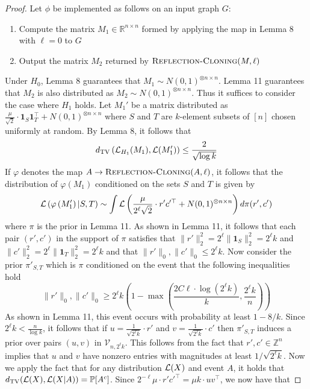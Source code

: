\documentclass[11pt]{article}
\begin{document}
\begin{proof}
Let $\phi$ be implemented as follows on an input graph $G$:
\begin{enumerate}
\item Compute the matrix $M_1 \in \mathbb{R}^{n \times n}$ formed by applying the map in Lemma 8 with $\ell = 0$ to $G$
\item Output the matrix $M_2$ returned by $\textsc{Reflection-Cloning}(M, \ell)$
\end{enumerate}
Under $H_0$, Lemma 8 guarantees that $M_1 \sim N(0, 1)^{\otimes n \times n}$. Lemma 11 guarantees that $M_2$ is also distributed as $M_2 \sim N(0, 1)^{\otimes n \times n}$. Thus it suffices to consider the case where $H_1$ holds. Let $M_1'$ be a matrix distributed as $\frac{\mu}{\sqrt{2}} \cdot \mathbf{1}_S \mathbf{1}_T^\top + N(0, 1)^{\otimes n \times n}$ where $S$ and $T$ are $k$-element subsets of $[n]$ chosen uniformly at random. By Lemma 8, it follows that
$$d_{\text{TV}}\left( \mathcal{L}_{H_1}(M_1), \mathcal{L}(M_1') \right) \le \frac{2}{\sqrt{\log k}}$$
If $\varphi$ denotes the map $A \to \textsc{Reflection-Cloning}(A, \ell)$, it follows that the distribution of $\varphi(M_1)$ conditioned on the sets $S$ and $T$ is given by
$$\mathcal{L}\left( \varphi\left( M_1' \right) | S, T \right) \sim \int \mathcal{L}\left( \frac{\mu}{2^\ell \sqrt{2}} \cdot r' c'^\top + N(0, 1)^{\otimes n \times n} \right) d\pi(r', c')$$
where $\pi$ is the prior in Lemma 11. As shown in Lemma 11, it follows that each pair $(r', c')$ in the support of $\pi$ satisfies that $\| r' \|_2^2 = 2^\ell \| \mathbf{1}_S \|_2^2 = 2^\ell k$ and $\| c' \|_2^2 = 2^\ell \| \mathbf{1}_T \|_2^2 = 2^\ell k$ and that $\| r' \|_0, \| c' \|_0 \le 2^\ell k$. Now consider the prior $\pi'_{S, T}$ which is $\pi$ conditioned on the event that the following inequalities hold
$$\| r' \|_0, \| c' \|_0 \ge 2^\ell k \left( 1 - \max\left(\frac{2C\ell \cdot \log (2^\ell k)}{k}, \frac{2^\ell k}{n}\right) \right)$$
As shown in Lemma 11, this event occurs with probability at least $1 - 8/k$. Since $2^{\ell} k < \frac{n}{\log k}$, it follows that if $u = \frac{1}{\sqrt{2^\ell k}} \cdot r'$ and $v = \frac{1}{\sqrt{2^\ell k}} \cdot c'$ then $\pi'_{S, T}$ induces a prior over pairs $(u, v)$ in $\mathcal{V}_{n, 2^\ell k}$. This follows from the fact that $r', c' \in \mathbb{Z}^n$ implies that $u$ and $v$ have nonzero entries with magnitudes at least $1/\sqrt{2^\ell k}$. Now we apply the fact that for any distribution $\mathcal{L}(X)$ and event $A$, it holds that $d_{\text{TV}}(\mathcal{L}(X), \mathcal{L}(X|A)) = \mathbb{P}[A^c]$. Since $2^{-\ell} \mu \cdot r' c'^\top = \mu k \cdot uv^\top$, we now have that

\end{proof}
\end{document}
